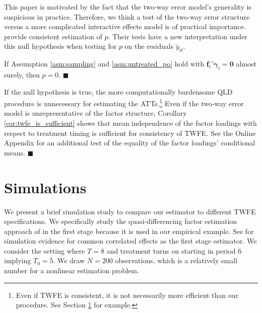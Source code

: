 \documentclass[12pt]{article}
\begin{document}
\begin{remark}\label{remark:twfe_testing}
  This paper is motivated by the fact that the two-way error model's generality is suspicious in practice. Therefore, we think a test of the two-way error structure versus a more complicated interactive effects model is of practical importance. \citet{Ahn_Lee_Schmidt_2013} provide consistent estimation of $p$. Their tests have a new interpretation under this null hypothesis when testing for $p$ on the residuals $\tilde{y}_{it}$.

  \begin{theorem}
    If Assumption \ref{asm:sampling} and \ref{asm:untreated_po} hold with $\bm f_t' \bm \gamma_i = \bm 0$ almost surely, then $p = 0$. $\blacksquare$
  \end{theorem}
  If the null hypothesis is true, the more computationally burdensome QLD procedure is unnecessary for estimating the ATTs.\footnote{Even if TWFE is consistent, it is not necessarily more efficient than our procedure. See Section \ref{sec:simulations} for example.} Even if the two-way error model is unrepresentative of the factor structure, Corollary \ref{cor:twfe_is_sufficient} shows that mean independence of the factor loadings with respect to treatment timing is sufficient for consistency of TWFE. See the Online Appendix for an additional test of the equality of the factor loadings' conditional means. $\blacksquare$
\end{remark}


\section{Simulations}\label{sec:simulations}

We present a brief simulation study to compare our estimator to different TWFE specifications. We specifically study the quasi-differencing factor estimation approach of \citet{Ahn_Lee_Schmidt_2013} in the first stage because it is used in our empirical example. See \citet{Brown_Butts_Westerlund_2023} for simulation evidence for common correlated effects as the first stage estimator. We consider the setting where $T = 8$ and treatment turns on starting in period 6 implying $T_0 = 5$. We draw $N = 200$ observations, which is a relatively small number for a nonlinear estimation problem.
\end{document}
